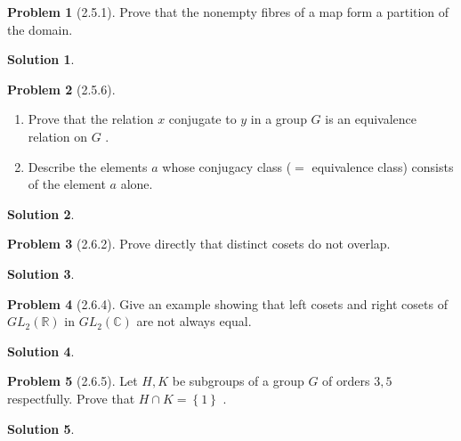 \documentclass[12pt]{article}
\theoremstyle{definition} %
\newtheorem{solution}{Solution}
\newtheorem{problem}{Problem}
\theoremstyle{plain} %
\begin{document}
\begin{problem}[2.5.1]
    Prove that the nonempty fibres of a map form a partition of the domain.
\end{problem}
\begin{solution}
    
\end{solution}
\begin{problem}[2.5.6]
    \noindent
   \begin{enumerate}
    \item Prove that the relation $x$ conjugate to $y$ in a group $G$ is an equivalence relation on $G$ .
    \item Describe the elements $a$ whose conjugacy class ($=$ equivalence class) consists of the element $a$ alone.
   \end{enumerate} 
\end{problem}
\begin{solution}
    
\end{solution}
\begin{problem}[2.6.2]
   Prove directly that distinct cosets do not overlap. 
\end{problem}
\begin{solution}
    
\end{solution}
\begin{problem}[2.6.4]
   Give an example showing that left cosets and right cosets of $GL_2(\mathbb{{R}})$ in $GL_2(\mathbb{{C}})$ are not always equal.
\end{problem}
\begin{solution}
    
\end{solution}
\begin{problem}[2.6.5]
   Let $H,K$ be subgroups of a group $G$ of orders $3,5$ respectfully. Prove that $H \cap K=\left\{ 1 \right\} $  . 
\end{problem}
\begin{solution}
    
\end{solution}
\end{document}
